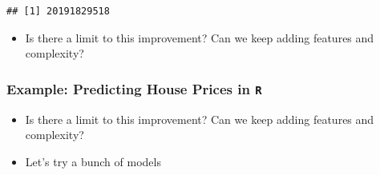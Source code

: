 \documentclass[
  shownotes,
  xcolor={svgnames},
  hyperref={colorlinks,citecolor=DarkBlue,linkcolor=DarkRed,urlcolor=DarkBlue}
  ]{beamer}
\newenvironment{Shaded}{\begin{snugshade}}{\end{snugshade}}
\newcommand{\DataTypeTok}[1]{\textcolor[rgb]{0.13,0.29,0.53}{#1}}
\newcommand{\DecValTok}[1]{\textcolor[rgb]{0.00,0.00,0.81}{#1}}
\newcommand{\KeywordTok}[1]{\textcolor[rgb]{0.13,0.29,0.53}{\textbf{#1}}}
\newcommand{\NormalTok}[1]{#1}
\newcommand{\OperatorTok}[1]{\textcolor[rgb]{0.81,0.36,0.00}{\textbf{#1}}}
\newcommand{\StringTok}[1]{\textcolor[rgb]{0.31,0.60,0.02}{#1}}
\begin{document}
\begin{frame}[fragile]
\begin{tiny}
\begin{verbatim}
## [1] 20191829518
\end{verbatim}
\end{tiny}

\begin{itemize}
  \item Is there a limit to this improvement? Can we keep adding features and complexity?
\end{itemize}

\end{frame}

\begin{frame}[fragile]
\frametitle{Example: Predicting House Prices in \texttt{R}}

\begin{itemize}
  \item Is there a limit to this improvement? Can we keep adding features and complexity?
  \item Let's try a bunch of models
\end{itemize}

\begin{Shaded}
\scriptsize
{}
\end{Shaded}
\end{frame}
\end{document}
